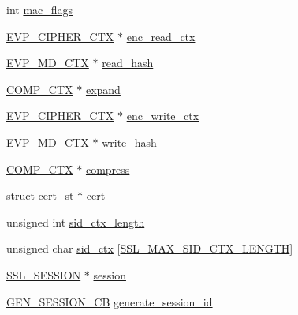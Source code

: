 \begin{DoxyCompactItemize}
\item 
int \hyperlink{structssl__st_a6de839ef12967c884c9b164d0161b814}{mac\+\_\+flags}
\item 
\hyperlink{crypto_2ossl__typ_8h_aab2bd6a044e1d31ebc2fe82b3b0b3d9a}{E\+V\+P\+\_\+\+C\+I\+P\+H\+E\+R\+\_\+\+C\+TX} $\ast$ \hyperlink{structssl__st_aa92ff498e1299cc44eaa05a3874b11b7}{enc\+\_\+read\+\_\+ctx}
\item 
\hyperlink{crypto_2ossl__typ_8h_a69cda4d21bd068f01c469222c1dd92fe}{E\+V\+P\+\_\+\+M\+D\+\_\+\+C\+TX} $\ast$ \hyperlink{structssl__st_adf71cda3ae267a5efdb7247bab05fa87}{read\+\_\+hash}
\item 
\hyperlink{crypto_2comp_2comp_8h_a9aa3298bb113c7c8e26a4f5cb9efb6d5}{C\+O\+M\+P\+\_\+\+C\+TX} $\ast$ \hyperlink{structssl__st_a63d40f110d479f42da6c60ca4eaf0e81}{expand}
\item 
\hyperlink{crypto_2ossl__typ_8h_aab2bd6a044e1d31ebc2fe82b3b0b3d9a}{E\+V\+P\+\_\+\+C\+I\+P\+H\+E\+R\+\_\+\+C\+TX} $\ast$ \hyperlink{structssl__st_a008aa0802f957af09044855de3328198}{enc\+\_\+write\+\_\+ctx}
\item 
\hyperlink{crypto_2ossl__typ_8h_a69cda4d21bd068f01c469222c1dd92fe}{E\+V\+P\+\_\+\+M\+D\+\_\+\+C\+TX} $\ast$ \hyperlink{structssl__st_a037b7f73660f920b2fb9753b71fb17b7}{write\+\_\+hash}
\item 
\hyperlink{crypto_2comp_2comp_8h_a9aa3298bb113c7c8e26a4f5cb9efb6d5}{C\+O\+M\+P\+\_\+\+C\+TX} $\ast$ \hyperlink{structssl__st_a72a47e1480cd1636742b4562411bdec2}{compress}
\item 
struct \hyperlink{structcert__st}{cert\+\_\+st} $\ast$ \hyperlink{structssl__st_abeb15d9b044d05f1c6506ce64ff9f187}{cert}
\item 
unsigned int \hyperlink{structssl__st_a924f0b0c8d0e6c35bac8a124589df9c2}{sid\+\_\+ctx\+\_\+length}
\item 
unsigned char \hyperlink{structssl__st_a26dc95db49d98798375078f7c1653ba4}{sid\+\_\+ctx} \mbox{[}\hyperlink{ssl_2ssl_8h_a5cef804495c6414283f4f29d4cea0dd0}{S\+S\+L\+\_\+\+M\+A\+X\+\_\+\+S\+I\+D\+\_\+\+C\+T\+X\+\_\+\+L\+E\+N\+G\+TH}\mbox{]}
\item 
\hyperlink{include_2openssl_2ssl_8h_a8dd6b81bbcb1b2d769235c37779d2a94}{S\+S\+L\+\_\+\+S\+E\+S\+S\+I\+ON} $\ast$ \hyperlink{structssl__st_a256a14c1af5a5311e78f1037d7ee2274}{session}
\item 
\hyperlink{ssl_2ssl_8h_a65a9d48d5b4f31797d3ce43e3ac7a8a1}{G\+E\+N\+\_\+\+S\+E\+S\+S\+I\+O\+N\+\_\+\+CB} \hyperlink{structssl__st_af147f6b9a405e9e8a94d7e5185381d57}{generate\+\_\+session\+\_\+id}
\item 

\end{DoxyCompactItemize}
